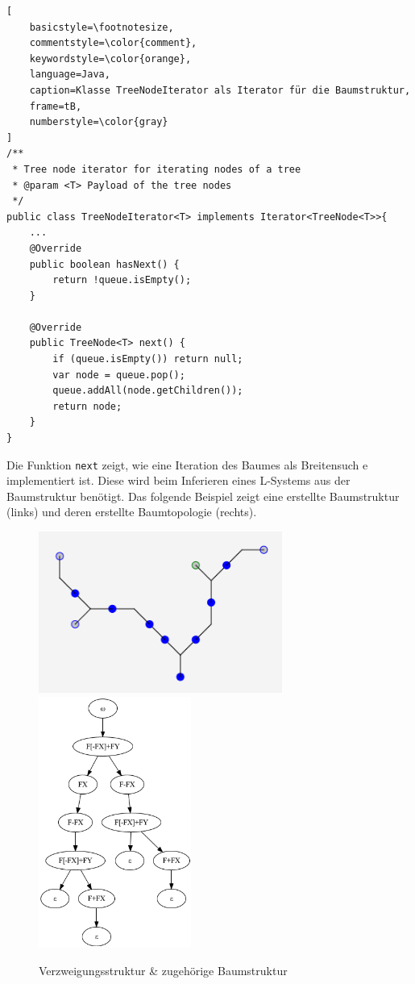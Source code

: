 \begin{lstlisting}[
    basicstyle=\footnotesize,
    commentstyle=\color{comment},
    keywordstyle=\color{orange},
    language=Java,
    caption=Klasse TreeNodeIterator als Iterator für die Baumstruktur,
    frame=tB,
    numberstyle=\color{gray}
]
/**
 * Tree node iterator for iterating nodes of a tree
 * @param <T> Payload of the tree nodes
 */
public class TreeNodeIterator<T> implements Iterator<TreeNode<T>>{
    ...
    @Override
    public boolean hasNext() {
        return !queue.isEmpty();
    }

    @Override
    public TreeNode<T> next() {
        if (queue.isEmpty()) return null;
        var node = queue.pop();
        queue.addAll(node.getChildren());
        return node;
    }
}
\end{lstlisting}
Die Funktion \texttt{next} zeigt, wie eine Iteration des Baumes als Breitensuch e implementiert ist.
Diese wird beim Inferieren eines L-Systems aus der Baumstruktur benötigt.
Das folgende Beispiel zeigt eine erstellte Baumstruktur (links) und deren erstellte Baumtopologie (rechts).
\begin{figure}[H]
    \centering
    \includegraphics[width=8cm]{../images/graph_tree.png}
    \includegraphics[width=5cm]{../images/tree_graph.png}
    \caption{Verzweigungsstruktur \& zugehörige Baumstruktur}
\end{figure}

